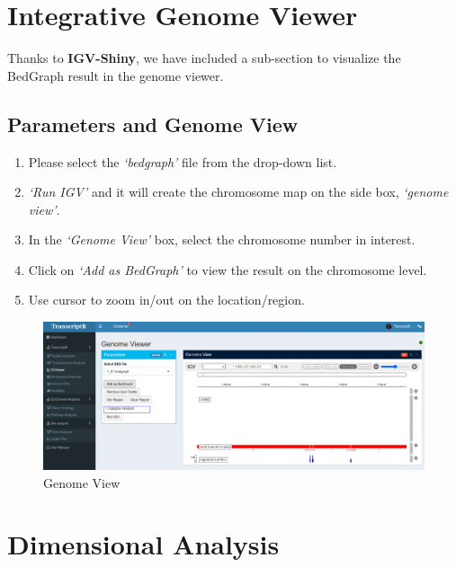 \documentclass[
  a4paper,
  oneside,
  open=any]{scrreport}
\providecommand{\tightlist}{%
  \setlength{\itemsep}{0pt}\setlength{\parskip}{0pt}}\usepackage{longtable,booktabs,array}
\begin{document}
\hypertarget{integrative-genome-viewer}{%
\chapter{Integrative Genome Viewer}\label{integrative-genome-viewer}}

Thanks to \textbf{IGV-Shiny}, we have included a sub-section to
visualize the BedGraph result in the genome viewer.

\hypertarget{parameters-and-genome-view}{%
\section{Parameters and Genome View}\label{parameters-and-genome-view}}

\begin{enumerate}
\def\labelenumi{\arabic{enumi}.}
\tightlist
\item
  Please select the \emph{`bedgraph'} file from the drop-down list.
\item
  \emph{`Run IGV'} and it will create the chromosome map on the side
  box, \emph{`genome view'}.
\item
  In the \emph{`Genome View'} box, select the chromosome number in
  interest.
\item
  Click on \emph{`Add as BedGraph'} to view the result on the chromosome
  level.
\item
  Use cursor to zoom in/out on the location/region.
\end{enumerate}

\begin{figure}[H]

{\centering \includegraphics{./images/igv/igv1.png}

}

\caption{\label{fig-igv1}Genome View}

\end{figure}

\hypertarget{sec-multid}{%
\chapter{Dimensional Analysis}\label{sec-multid}}
\end{document}
